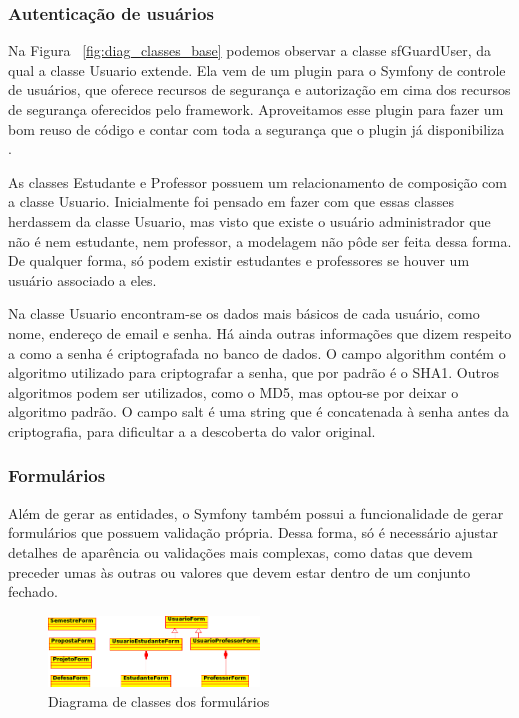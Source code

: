 \subsubsection{Autenticação de usuários}
Na Figura ~\ref{fig:diag_classes_base} podemos observar a classe sfGuardUser, da qual a classe Usuario extende.
Ela vem de um plugin para o Symfony de controle de usuários, que oferece recursos de segurança
e autorização em cima dos recursos de segurança oferecidos pelo framework. Aproveitamos esse plugin
para fazer um bom reuso de código e contar com toda a segurança que o plugin já disponibiliza \cite{sfguardplugin}.

As classes Estudante e Professor possuem um relacionamento de composição com a classe Usuario.
Inicialmente foi pensado em fazer com que essas classes herdassem da classe Usuario, mas visto
que existe o usuário administrador que não é nem estudante, nem professor, a modelagem não pôde
ser feita dessa forma. De qualquer forma, só podem existir estudantes e professores se houver um usuário
associado a eles.

Na classe Usuario encontram-se os dados mais básicos de cada usuário, como nome, endereço de email e senha.
Há ainda outras informações que dizem respeito a como a senha é criptografada no banco de dados. 
O campo algorithm contém o algoritmo utilizado para criptografar a senha, que por padrão é o SHA1. 
Outros algoritmos podem ser utilizados, como o MD5, mas optou-se por deixar o algoritmo padrão.
O campo salt é uma string que é concatenada à senha antes da criptografia, para dificultar a a 
descoberta do valor original.

\subsubsection{Formulários}
Além de gerar as entidades, o Symfony também possui a funcionalidade de gerar formulários que
possuem validação própria. Dessa forma, só é necessário ajustar detalhes de aparência ou
validações mais complexas, como datas que devem preceder umas às outras ou valores que devem 
estar dentro de um conjunto fechado.

\begin{figure}[htbp]
\centering
\includegraphics[width=0.5\textwidth]{fig/uml_forms.png}
\caption{Diagrama de classes dos formulários}
\label{fig:diag_forms}
\end{figure}

